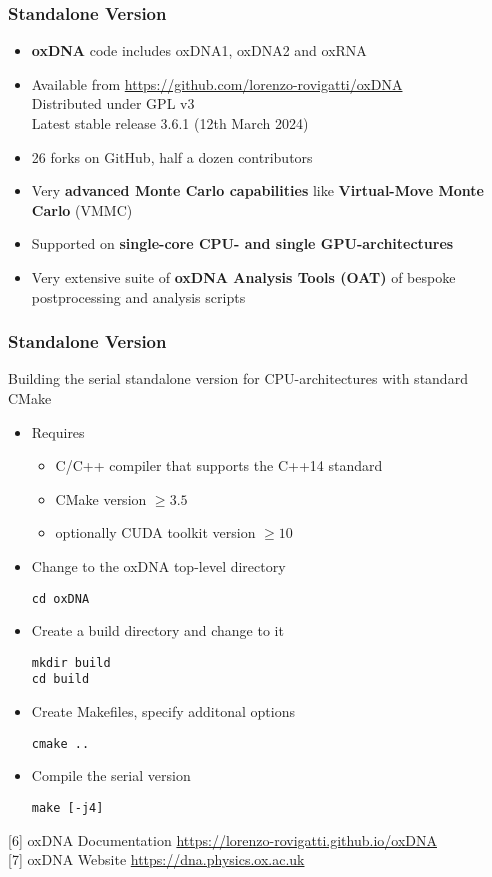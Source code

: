 \documentclass[slidestop,compress,9pt]{beamer}
\begin{document}
\begin{frame}
\frametitle{Standalone Version}

\begin{itemize}
\setlength\itemsep{10pt}
\item \textbf{oxDNA} code includes oxDNA1, oxDNA2 and oxRNA 
\item Available from \href{https://github.com/lorenzo-rovigatti/oxDNA}{https://github.com/lorenzo-rovigatti/oxDNA}\\
Distributed under GPL v3\\
Latest stable release 3.6.1 (12th March 2024)
\item 26 forks on GitHub, half a dozen contributors
\item Very \textbf{advanced Monte Carlo capabilities} like \textbf{Virtual-Move Monte Carlo} (VMMC) 
\item Supported on \textbf{single-core CPU- and single GPU-architectures}
\item Very extensive suite of \textbf{oxDNA Analysis Tools (OAT)} of bespoke postprocessing and analysis scripts 
\end{itemize}

\end{frame}

\begin{frame}[fragile]
\frametitle{Standalone Version}
Building the serial standalone version for CPU-architectures with standard CMake

\begin{itemize}
\item Requires

\begin{itemize}
\item C/C++ compiler that supports the C++14 standard
\item CMake version $\ge 3.5$
\item optionally CUDA toolkit version $\ge 10$
\end{itemize}
\item Change to the oxDNA top-level directory
\linespread{0.4}
\begin{lstlisting}
cd oxDNA
\end{lstlisting}
\item Create a build directory and change to it
\begin{lstlisting}
mkdir build
cd build
\end{lstlisting}
\item Create Makefiles, specify additonal options
\begin{lstlisting}
cmake ..
\end{lstlisting}
\item Compile the serial version
\begin{lstlisting}
make [-j4]
\end{lstlisting}
\end{itemize}

[6] oxDNA Documentation \href{https://lorenzo-rovigatti.github.io/oxDNA}{https://lorenzo-rovigatti.github.io/oxDNA}\\[3pt]
[7] oxDNA Website \href{https://dna.physics.ox.ac.uk}{https://dna.physics.ox.ac.uk}

\end{frame}
\end{document}
